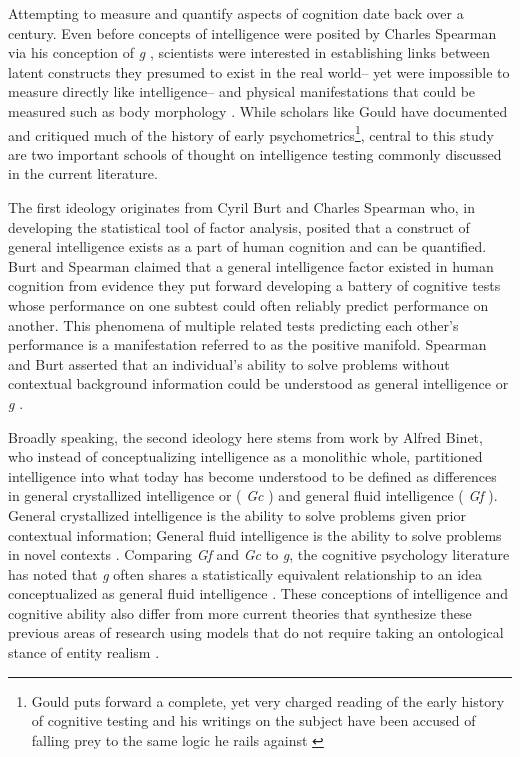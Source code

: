 \documentclass[12pt,]{book}
\let\rmarkdownfootnote\footnote%
\def\footnote{\protect\rmarkdownfootnote}
\begin{document}
Attempting to measure and quantify aspects of cognition date back over a century.
Even before concepts of intelligence were posited by Charles Spearman via his conception of \emph{g} \citep{spearmanGeneralIntelligenceObjectively1904}, scientists were interested in establishing links between latent constructs they presumed to exist in the real world-- yet were impossible to measure directly like intelligence-- and physical manifestations that could be measured such as body morphology \citep{gouldMismeasureMan1996}.
While scholars like Gould have documented and critiqued much of the history of early psychometrics\footnote{Gould puts forward a complete, yet very charged reading of the early history of cognitive testing and his writings on the subject have been accused of falling prey to the same logic he rails against \citep{warneStephenJayGould2019}}, central to this study are two important schools of thought on intelligence testing commonly discussed in the current literature.

The first ideology originates from Cyril Burt and Charles Spearman who, in developing the statistical tool of factor analysis, posited that a construct of general intelligence exists as a part of human cognition and can be quantified.
Burt and Spearman claimed that a general intelligence factor existed in human cognition from evidence they put forward developing a battery of cognitive tests whose performance on one subtest could often reliably predict performance on another.
This phenomena of multiple related tests predicting each other's performance is a manifestation referred to as the positive manifold.
Spearman and Burt asserted that an individual's ability to solve problems without contextual background information could be understood as general intelligence or \emph{g} \citep{spearmanGeneralIntelligenceObjectively1904}.

Broadly speaking, the second ideology here stems from work by Alfred Binet, who instead of conceptualizing intelligence as a monolithic whole, partitioned intelligence into what today has become understood to be defined as differences in general crystallized intelligence or ( \emph{Gc} ) and general fluid intelligence ( \emph{Gf} ).
General crystallized intelligence is the ability to solve problems given prior contextual information;
General fluid intelligence is the ability to solve problems in novel contexts \citep{cattellAbilitiesTheirGrowth1971, jhornTheoryFluidCrystalized1994} .
Comparing \emph{Gf} and \emph{Gc} to \emph{g}, the cognitive psychology literature has noted that \emph{g} often shares a statistically equivalent relationship to an idea conceptualized as general fluid intelligence \citep{matzkeIssuePowerIdentification2010}.
These conceptions of intelligence and cognitive ability also differ from more current theories that synthesize these previous areas of research \citep{kovacsProcessOverlapTheory2016} using models that do not require taking an ontological stance of entity realism \citep{borsboomTheoreticalStatusLatent2003}.
\end{document}
